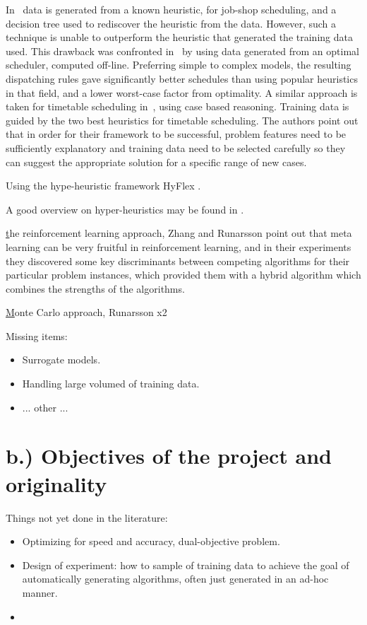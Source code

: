\documentclass[12pt,a4paper]{article}
\begin{document}
In~\cite{Siggi05} data is generated from a known heuristic, for job-shop scheduling, and a decision tree used to 
rediscover the heuristic from the data. However, such a technique is unable to outperform the heuristic that generated 
the training data used. This drawback was confronted in~\cite{Malik08,Russell09,Siggi10} by using data generated from 
an optimal scheduler, computed off-line.  Preferring simple to complex models, the resulting dispatching rules gave 
significantly better schedules than using popular heuristics in that field, and a lower worst-case factor from 
optimality. A similar approach is taken for timetable scheduling in~\cite{Burke06}, using case based reasoning. 
Training data is guided by the two best heuristics for timetable scheduling. The authors point out that in order for 
their framework to be successful, problem features need to be sufficiently explanatory and training data need to be 
selected carefully so they can suggest the appropriate solution for a specific range of new cases. 


Using the hype-heuristic framework HyFlex \cite{ochoa2012hyflex}.


A good overview on hyper-heuristics may be found in \cite{burke2010hyper}.


{\underline the reinforcement learning approach, Zhang and Runarsson}
\cite{Kalyanakrishnan2011} point out that meta learning can be very fruitful in reinforcement learning, and in their 
experiments they discovered some key discriminants between competing algorithms for their particular problem 
instances, which provided them with a hybrid algorithm which combines the strengths of the algorithms.


{\underline Monte Carlo approach, Runarsson x2}


Missing items:
\begin{itemize}
\item Surrogate models.
\item Handling large volumed of training data.
\item ... other ...

\end{itemize}



\section*{\normalsize b.) Objectives of the project and originality}

Things not yet done in the literature:
\begin{itemize}
\item Optimizing for speed and accuracy, dual-objective problem.
\item Design of experiment: how to sample of training data to achieve the goal of automatically generating algorithms, 
often just generated in an ad-hoc manner.
\item 
\end{itemize}
\end{document}
